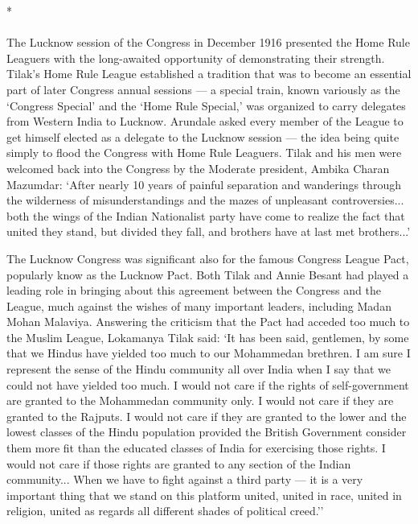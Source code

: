 \begin{center}*\end{center}

\paragraph*{}


The Lucknow session of the Congress in December 1916 presented the Home Rule Leaguers with the long-awaited opportunity of demonstrating their strength. Tilak's Home Rule League established a tradition that was to become an essential part of later Congress annual sessions — a special train, known variously as the `Congress Special' and the `Home Rule Special,' was organized to carry delegates from Western India to Lucknow. Arundale asked every member of the League to get himself elected as a delegate to the Lucknow session — the idea being quite simply to flood the Congress with Home Rule Leaguers. Tilak and his men were welcomed back into the Congress by the Moderate president, Ambika Charan Mazumdar: `After nearly 10 years of painful separation and wanderings through the wilderness of misunderstandings and the mazes of unpleasant controversies... both the wings of the Indian Nationalist party have come to realize the fact that united they stand, but divided they fall, and brothers have at last met brothers...'

The Lucknow Congress was significant also for the famous Congress League Pact, popularly know as the Lucknow Pact. Both Tilak and Annie Besant had played a leading role in bringing about this agreement between the Congress and the League, much against the wishes of many important leaders, including Madan Mohan Malaviya. Answering the criticism that the Pact had acceded too much to the Muslim League, Lokamanya Tilak said: `It has been said, gentlemen, by some that we Hindus have yielded too much to our Mohammedan brethren. I am sure I represent the sense of the Hindu community all over India when I say that we could not have yielded too much. I would not care if the rights of self-government are granted to the Mohammedan community only. I would not care if they are granted to the Rajputs. I would not care if they are granted to the lower and the lowest classes of the Hindu population provided the British Government consider them more fit than the educated classes of India for exercising those rights. I would not care if those rights are granted to any section of the Indian community... When we have to fight against a third party — it is a very important thing that we stand on this platform united, united in race, united in religion, united as regards all different shades of political creed.''


